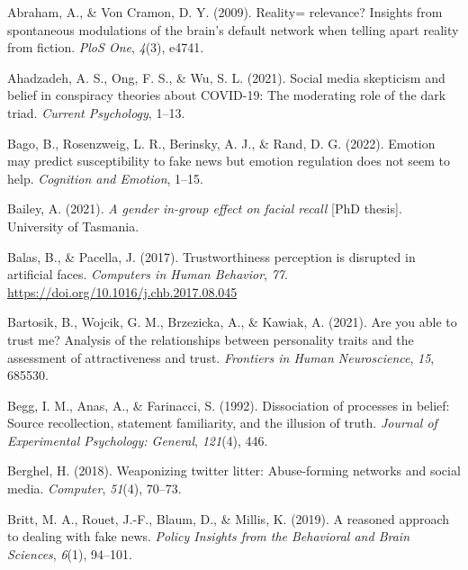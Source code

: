 \documentclass[
  man,mask,floatsintext]{apa6}
\newlength{\cslhangindent}
\newlength{\cslentryspacingunit} %
\newenvironment{CSLReferences}[2] %
 {%
  \setlength{\parindent}{0pt}
  \ifodd #1
  \let\oldpar\par
  \def\par{\hangindent=\cslhangindent\oldpar}
  \fi
  \setlength{\parskip}{#2\cslentryspacingunit}
 }%
 {}
\begin{document}
\hypertarget{refs}{}
\begin{CSLReferences}{1}{0}
\leavevmode{}%
Abraham, A., \& Von Cramon, D. Y. (2009). Reality= relevance? Insights from spontaneous modulations of the brain's default network when telling apart reality from fiction. \emph{PloS One}, \emph{4}(3), e4741.

\leavevmode{}%
Ahadzadeh, A. S., Ong, F. S., \& Wu, S. L. (2021). Social media skepticism and belief in conspiracy theories about COVID-19: The moderating role of the dark triad. \emph{Current Psychology}, 1--13.

\leavevmode{}%
Bago, B., Rosenzweig, L. R., Berinsky, A. J., \& Rand, D. G. (2022). Emotion may predict susceptibility to fake news but emotion regulation does not seem to help. \emph{Cognition and Emotion}, 1--15.

\leavevmode{}%
Bailey, A. (2021). \emph{A gender in-group effect on facial recall} {[}PhD thesis{]}. University of Tasmania.

\leavevmode{}%
Balas, B., \& Pacella, J. (2017). Trustworthiness perception is disrupted in artificial faces. \emph{Computers in Human Behavior}, \emph{77}. \url{https://doi.org/10.1016/j.chb.2017.08.045}

\leavevmode{}%
Bartosik, B., Wojcik, G. M., Brzezicka, A., \& Kawiak, A. (2021). Are you able to trust me? Analysis of the relationships between personality traits and the assessment of attractiveness and trust. \emph{Frontiers in Human Neuroscience}, \emph{15}, 685530.

\leavevmode{}%
Begg, I. M., Anas, A., \& Farinacci, S. (1992). Dissociation of processes in belief: Source recollection, statement familiarity, and the illusion of truth. \emph{Journal of Experimental Psychology: General}, \emph{121}(4), 446.

\leavevmode{}%
Berghel, H. (2018). Weaponizing twitter litter: Abuse-forming networks and social media. \emph{Computer}, \emph{51}(4), 70--73.

\leavevmode{}%
Britt, M. A., Rouet, J.-F., Blaum, D., \& Millis, K. (2019). A reasoned approach to dealing with fake news. \emph{Policy Insights from the Behavioral and Brain Sciences}, \emph{6}(1), 94--101.


\end{CSLReferences}
\end{document}

